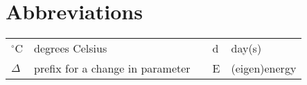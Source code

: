 \chapter*{Abbreviations}
\begin{table}
	\label{tab:b_params}
	\begin{tabular}{l l l l l}
		$^\circ$C & degrees Celsius	                 & & d & day(s) \\
	  $\Delta$  & prefix for a change in parameter & & E & (eigen)energy  \\
	\end{tabular}
\end{table}
